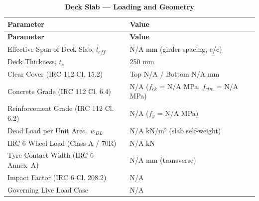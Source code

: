 \documentclass[12pt,a4paper]{report}
\numberwithin{table}{chapter}
\numberwithin{figure}{chapter}
\newcommand{\ReportTableSetup}{%
  \setlength{\tabcolsep}{3.0pt}%
  \renewcommand{\arraystretch}{1.18}%
  \setlength{\arrayrulewidth}{0.4pt}\setlength{\extrarowheight}{0.5pt}%
  \setlength{\LTleft}{\fill}\setlength{\LTright}{\fill}%
  \setlength{\LTpre}{4pt}\setlength{\LTpost}{8pt}}
\newcommand{\ReportTableFont}{\small}
\newcommand{\ReportRowGap}{3.0pt}
\newcommand{\ReportTableGap}{\vspace{0.5em}}
\begin{document}
\ReportTableGap
\begingroup
\ReportTableSetup
\ReportTableFont
\begin{longtable}{|L{5.5000cm}|p{10.0000cm}|}
\caption{\textbf{Deck Slab --- Loading and Geometry}}\\
\hline
\textbf{Parameter} & \textbf{Value} \\
\hline
\endfirsthead
\hline
\textbf{Parameter} & \textbf{Value} \\
\hline
\endhead
\hline
\endfoot
\hline
\endlastfoot

\textnormal{Effective Span of Deck Slab, $l_{eff}$} & N/A mm (girder spacing, c/c) \\[\ReportRowGap]
\hline
\textnormal{Deck Thickness, $t_s$} & 250 mm \\[\ReportRowGap]
\hline
\textnormal{Clear Cover (IRC 112 Cl. 15.2)} & Top N/A / Bottom N/A mm \\[\ReportRowGap]
\hline
\textnormal{Concrete Grade (IRC 112 Cl. 6.4)} & N/A ($f_{ck}$ = N/A MPa, $f_{ctm}$ = N/A MPa) \\[\ReportRowGap]
\hline
\textnormal{Reinforcement Grade (IRC 112 Cl. 6.2)} & N/A ($f_y$ = N/A MPa) \\[\ReportRowGap]
\hline
\textnormal{Dead Load per Unit Area, $w_{DL}$} & N/A kN/m² (slab self-weight) \\[\ReportRowGap]
\hline
\textnormal{IRC 6 Wheel Load (Class A / 70R)} & N/A kN \\[\ReportRowGap]
\hline
\textnormal{Tyre Contact Width (IRC 6 Annex~A)} & N/A mm (transverse) \\[\ReportRowGap]
\hline
\textnormal{Impact Factor (IRC 6 Cl. 208.2)} & N/A \\[\ReportRowGap]
\hline
\textnormal{Governing Live Load Case} & N/A \\[\ReportRowGap]
\hline
\end{longtable}
\endgroup
\end{document}
